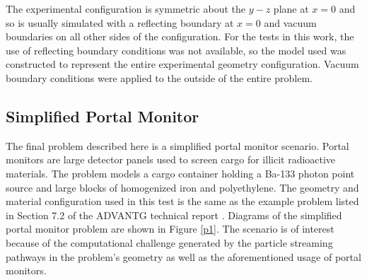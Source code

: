 \documentclass{article} %
\begin{document}
The experimental configuration is symmetric about the $y-z$ plane at $x = 0$
and so is usually simulated with a reflecting boundary at $x = 0$ and vacuum
boundaries on all other sides of the configuration. For the tests in this work,
the use of reflecting boundary conditions was not available, so the model used 
was constructed to represent the entire experimental geometry configuration.
Vacuum boundary conditions were applied to the outside of the entire problem.

\subsection{Simplified Portal Monitor}

The final problem described here is a simplified portal monitor scenario.
Portal monitors are large detector panels used to screen cargo for illicit
radioactive materials. The problem models a cargo container holding a Ba-133
photon point source and large blocks of homogenized iron and polyethylene.
The geometry and material configuration used in this test is the same as the
example problem listed in Section 7.2 of the ADVANTG technical report
\cite{advantg}. Diagrams of the simplified portal monitor problem are shown in
Figure \ref{p1}. The scenario is of interest because of the computational
challenge generated by the particle streaming pathways in the problem's
geometry as well as the aforementioned usage of portal monitors.
\end{document}
